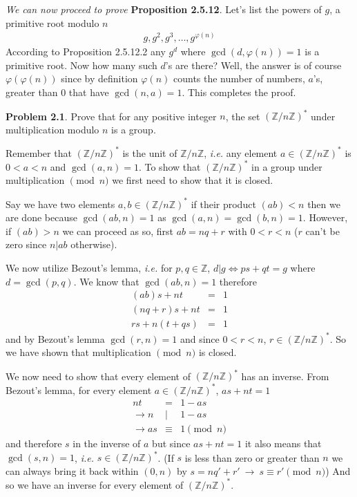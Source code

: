 \documentclass[aps,preprint,preprintnumbers,nofootinbib,showpacs,prd]{revtex4-1}
\newcommand{\ie}{{\it i.e.} }
\newcommand{\nbea}{\begin{eqnarray*}}
\newcommand{\neea}{\end{eqnarray*}}
\begin{document}
\bigskip

{\it We can now proceed to prove}  {\bf Proposition 2.5.12}. Let's list the powers of $g$, a primitive root modulo $n$
%
\nbea
g, g^2, g^3 , \dots, g^{\varphi(n)}
\neea
%
According to Proposition 2.5.12.2 any $g^d$ where $\gcd(d,\varphi(n))=1$ is a primitive root. Now how many such $d$'s are there? Well, the answer is of course $\varphi(\varphi(n))$ since by definition $\varphi(n)$ counts the number of numbers, $a$'s, greater than 0 that have $\gcd(n,a)=1$. This completes the proof.

{\bf Problem 2.1}. Prove that for any positive integer $n$, the set $(\mathbb{Z}/n\mathbb{Z})^*$ under multiplication modulo $n$ is a group.

Remember that $(\mathbb{Z}/n\mathbb{Z})^*$ is the unit of $\mathbb{Z}/n\mathbb{Z}$, \ie any element $a \in (\mathbb{Z}/n\mathbb{Z})^*$ is $0 < a < n$ and $\gcd(a,n) = 1$. To show that $(\mathbb{Z}/n\mathbb{Z})^*$ in a group under multiplication $\pmod{n}$ we first need to show that it is closed.

Say we have two elements $a,b \in (\mathbb{Z}/n\mathbb{Z})^*$ if their product $(ab) < n$ then we are done because $\gcd(ab,n)=1$ as $\gcd(a,n)=\gcd(b,n)=1$. However, if $(ab) > n$ we can proceed as so, first $ab = nq + r$ with $0 < r <n$ ($r$ can't be zero since $n|ab$ otherwise).

We now utilize Bezout's lemma, \ie for $p,q \in \mathbb{Z}$,  $d|g \Longleftrightarrow ps + qt = g$  where $d = \gcd(p,q)$. We know that $\gcd(ab,n)=1$ therefore
%
\nbea
(ab)s + nt & = & 1 \\
(nq + r)s + nt & = & 1 \\
rs + n(t+qs) & = & 1
\neea
%
and by Bezout's lemma $\gcd(r,n)=1$ and since $0 < r < n$, $r \in (\mathbb{Z}/n\mathbb{Z})^*$. So we have shown that multiplication $\pmod{n}$ is closed.

We now need to show that every element of $(\mathbb{Z}/n\mathbb{Z})^*$ has an inverse. From Bezout's lemma, for every element $a \in (\mathbb{Z}/n\mathbb{Z})^*$, $as + nt = 1$ 
%
\nbea
nt & = & 1 - as \\
\to n &|& 1 - as \\
\to as & \equiv & 1 \pmod{n}
\neea
%
and therefore $s$ in the inverse of $a$ but since $as + nt = 1$ it also means that $\gcd(s,n)=1$, \ie $s \in (\mathbb{Z}/n\mathbb{Z})^*$. (If $s$ is less than zero or greater than $n$ we can always bring it back within $(0,n)$ by $s = nq' + r' ~\to ~s \equiv r' \pmod{n}$) And so we have an inverse for every element of $(\mathbb{Z}/n\mathbb{Z})^*$.
\end{document}
